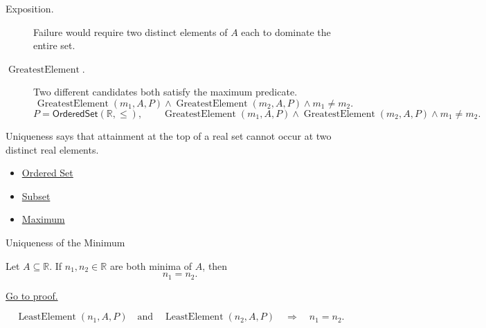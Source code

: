 \begin{remark*}
\begin{description}
  \item[Exposition.]
  Failure would require two distinct elements of $A$ each to dominate the
  entire set.

  \item[\(\operatorname{GreatestElement}.\)]
  Two different candidates both satisfy the maximum predicate.
  \[
    \operatorname{GreatestElement}(m_{1},A,P)\land
    \operatorname{GreatestElement}(m_{2},A,P)\land m_{1}\neq m_{2}.
  \]
  \[
    P=\mathsf{OrderedSet}(\mathbb{R},\leq),\qquad
    \operatorname{GreatestElement}(m_{1},A,P)\land
    \operatorname{GreatestElement}(m_{2},A,P)\land m_{1}\neq m_{2}.
  \]
\end{description}
\end{remark*}

\begin{remark*}[Interpretation]
Uniqueness says that attainment at the top of a real set cannot occur at
two distinct real elements.
\end{remark*}

\begin{dependencies}
\begin{itemize}
  \item \hyperref[def:ordered-set]{Ordered Set}
  \item \hyperref[def:subset]{Subset}
  \item \hyperref[def:maximum]{Maximum}
\end{itemize}
\end{dependencies}

\begin{propositionbox}{Uniqueness of the Minimum}
\begin{proposition}
\label{prop:uniqueness-of-the-minimum}
Let $A\subseteq\mathbb{R}$. If $n_1,n_2\in\mathbb{R}$ are both minima of
$A$, then
\[
  n_1=n_2.
\]

\hyperref[prf:uniqueness-of-the-minimum]{Go to proof.}
\end{proposition}
\end{propositionbox}

\begin{remark*}
\[
  \operatorname{LeastElement}(n_{1},A,P)
  \quad\text{and}\quad
  \operatorname{LeastElement}(n_{2},A,P)
  \quad\Longrightarrow\quad
  n_{1}=n_{2}.
\]
\end{remark*}

